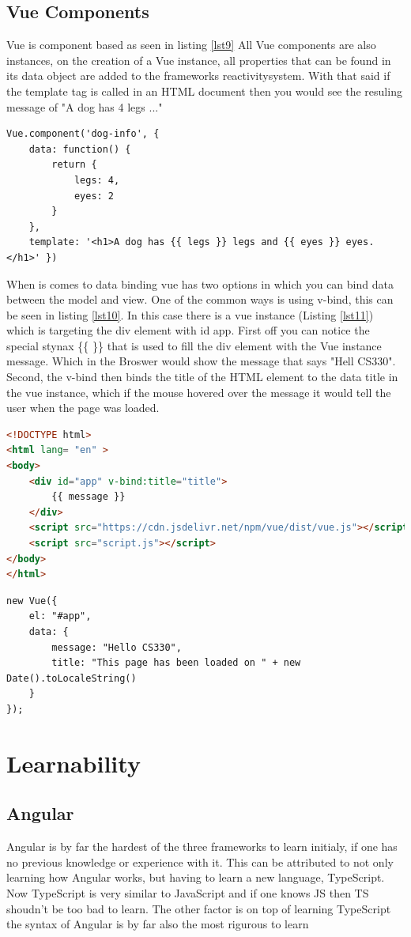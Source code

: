 \documentclass[11pt]{article}
\begin{document}
\subsection{Vue Components}
Vue is component based as seen in listing \ref{lst9} All Vue components are also instances, on the creation of a Vue instance, all properties that can be found in its data object are added to the frameworks 
reactivitysystem. With that said if the template tag is called in an HTML document then you would see the resuling message of "A dog has 4 legs ..."
\begin{lstlisting}[caption={Vue component}, label={lst9}]
Vue.component('dog-info', {
    data: function() {
        return {
            legs: 4,
            eyes: 2
        }
    },
    template: '<h1>A dog has {{ legs }} legs and {{ eyes }} eyes.</h1>' })
\end{lstlisting}
When is comes to data binding vue has two options in which you can bind data between the model and view. One of the common ways is using v-bind, this can be seen in listing \ref{lst10}. In this case there is a vue
instance (Listing \ref{lst11}) which is targeting the div element with id app. First off you can notice the special stynax \{\{ \}\} that is used to fill the div element with the Vue instance message. Which in the 
Broswer would show the message that says "Hell CS330". Second, the v-bind then binds the title of the HTML element to the data title in the vue instance, which if the mouse hovered over the message it would tell 
the user when the page was loaded. 
\begin{lstlisting}[language=HTML, caption={HTML Code for Vue Example}, label={lst10}]
<!DOCTYPE html>
<html lang= "en" >
<body>
    <div id="app" v-bind:title="title">
        {{ message }}
    </div>
    <script src="https://cdn.jsdelivr.net/npm/vue/dist/vue.js"></script>
    <script src="script.js"></script>
</body>
</html>
\end{lstlisting}

\begin{lstlisting}[caption={Vue.js example}, label={lst11}]
new Vue({
    el: "#app",
    data: {
        message: "Hello CS330",
        title: "This page has been loaded on " + new Date().toLocaleString()
    }
});  
\end{lstlisting}

\section{Learnability}
\subsection{Angular}
Angular is by far the hardest of the three frameworks to learn initialy, if one has no previous knowledge or experience with it. This can be attributed to not only learning how Angular works, but having to learn a new language,
TypeScript. Now TypeScript is very similar to JavaScript and if one knows JS then TS shoudn't be too bad to learn. The other factor is on top of learning TypeScript the syntax of Angular is by far also the most rigurous to 
learn
\end{document}
